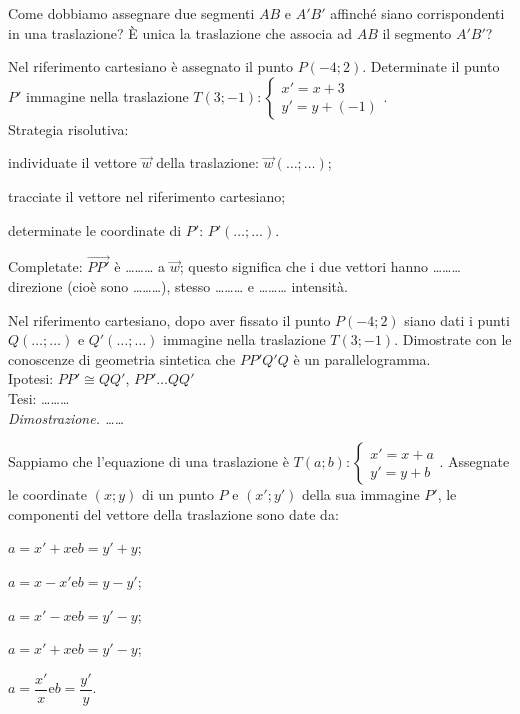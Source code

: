 \begin{esercizio}
\label{ese:8.47} %
Come dobbiamo assegnare due segmenti $AB$ e $A'B'$ affinché siano corrispondenti in una traslazione? \`E unica la traslazione che associa ad $AB$ il segmento $A'B'$?
\end{esercizio}

\begin{esercizio}
\label{ese:8.48} %
Nel riferimento cartesiano è assegnato il punto $P(-4;2)$. Determinate il punto $P'$ immagine nella traslazione $T(3;-1):\begin{cases}x'=x+3\\y'=y+(-1)\end{cases}$.\\
Strategia risolutiva:
\begin{enumerate*}
\item individuate il vettore $\vec{w}$ della traslazione: $\vec{w}(\ldots{};\ldots{})$;
\item tracciate il vettore nel riferimento cartesiano;
\item determinate le coordinate di $P'$: $P'(\ldots{};\ldots{})$.
\end{enumerate*}
Completate: $\overrightarrow{PP'}$ è \ldots\ldots\ldots{} a $\vec{w}$; questo significa che i due vettori hanno \ldots\ldots\ldots{} direzione (cioè sono \ldots\ldots\ldots{}), stesso \ldots\ldots\ldots{} e \ldots\ldots\ldots{} intensità.
\end{esercizio}

\begin{esercizio}
\label{ese:8.49} %
Nel riferimento cartesiano, dopo aver fissato il punto $P(-4;2)$ siano dati i punti $Q(\ldots{};\ldots{})$ e $Q'(\ldots{};\ldots{})$ immagine nella traslazione $T(3;-1)$. Dimostrate con le conoscenze di geometria sintetica che $PP'Q'Q$ è un parallelogramma.\\
\noindent Ipotesi: $PP'\cong QQ'$, $PP'\ldots{}QQ'$\\
Tesi: \ldots\ldots\ldots{}\\
\emph{Dimostrazione. \ldots\ldots{}}
\end{esercizio}

\begin{esercizio}
\label{ese:8.50} %
Sappiamo che l'equazione di una traslazione è $T(a;b):\begin{cases}x'=x+a\\y'=y+b\end{cases}$. Assegnate le coordinate $(x;y)$ di un punto $P$ e $(x';y')$ della sua immagine $P'$, le componenti del vettore della traslazione sono date da:
\begin{enumeratea}
\item $a=x'+x$\quad e\quad $b=y'+y$;
\item $a=x-x'$\quad e\quad $b=y-y'$;
\item $a=x'-x$\quad e\quad $b=y'-y$;
\item $a=x'+x$\quad e\quad $b=y'-y$;
\item $a=\dfrac{x'}{x}$\quad e\quad $b=\dfrac{y'}{y}$.
\end{enumeratea}
\end{esercizio}


